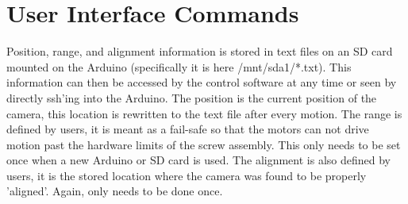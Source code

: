 \documentclass[11pt]{article}
\begin{document}
\section{User Interface Commands}
	Position, range, and alignment information is stored in text files on an SD card mounted on the Arduino (specifically it is here  /mnt/sda1/*.txt).
	This information can then be accessed by the control software at any time or seen by directly ssh'ing into the Arduino.
	The position is the current position of the camera, this location is rewritten to the text file after every motion.
	The range is defined by users, it is meant as a fail-safe so that the motors can not drive motion past the hardware limits of the screw assembly.
	This only needs to be set once when a new Arduino or SD card is used.
	The alignment is also defined by users, it is the stored location where the camera was found to be properly 'aligned'.
	Again, only needs to be done once.
\end{document}
